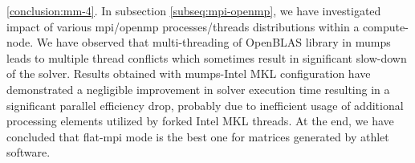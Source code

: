 

	
\ref{conclusion:mm-4}. In subsection \ref{subseq:mpi-openmp}, we have investigated impact of various
\gls{mpi}/\gls{openmp} processes/threads distributions within a compute-node. We have observed that multi-threading of
OpenBLAS library in \gls{mumps} leads to multiple thread conflicts which sometimes result in significant slow-down of the solver. Results obtained with \gls{mumps}-Intel MKL configuration have demonstrated a negligible improvement in solver execution time resulting in a significant parallel efficiency drop, probably due to inefficient usage of additional processing elements utilized by forked Intel MKL threads. At the end, we have concluded that flat-\gls{mpi} mode is the best one for matrices generated by \gls{athlet} software.\\








